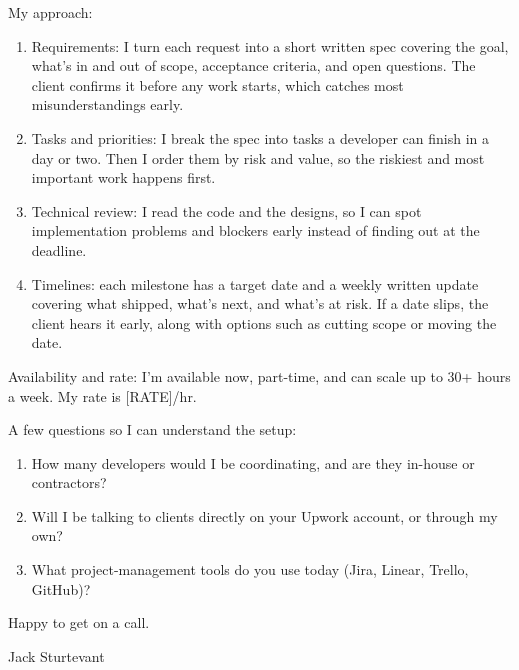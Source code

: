 \documentclass[11pt]{article}
\begin{document}
My approach:
\begin{enumerate}
\item Requirements: I turn each request into a short written spec covering the goal, what's in and out of scope, acceptance criteria, and open questions. The client confirms it before any work starts, which catches most misunderstandings early.
\item Tasks and priorities: I break the spec into tasks a developer can finish in a day or two. Then I order them by risk and value, so the riskiest and most important work happens first.
\item Technical review: I read the code and the designs, so I can spot implementation problems and blockers early instead of finding out at the deadline.
\item Timelines: each milestone has a target date and a weekly written update covering what shipped, what's next, and what's at risk. If a date slips, the client hears it early, along with options such as cutting scope or moving the date.
\end{enumerate}

Availability and rate: I'm available now, part-time, and can scale up to 30+ hours a week. My rate is [RATE]/hr.

A few questions so I can understand the setup:
\begin{enumerate}
\item How many developers would I be coordinating, and are they in-house or contractors?
\item Will I be talking to clients directly on your Upwork account, or through my own?
\item What project-management tools do you use today (Jira, Linear, Trello, GitHub)?
\end{enumerate}

Happy to get on a call.

\vspace{0.4em}
Jack Sturtevant
\end{document}
